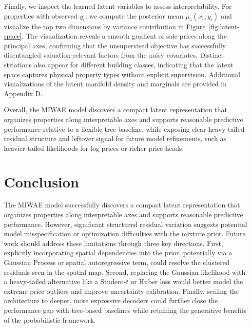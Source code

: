 \documentclass{article}
\begin{document}
Finally, we inspect the learned latent variables to assess interpretability. For properties with observed $y_i$, we compute the posterior mean $\mu_z(x_i, y_i)$ and visualize the top two dimensions by variance contribution in Figure~\ref{fig:latent-space}. The visualization reveals a smooth gradient of sale prices along the principal axes, confirming that the unsupervised objective has successfully disentangled valuation-relevant factors from the noisy covariates. Distinct striations also appear for different building classes, indicating that the latent space captures physical property types without explicit supervision. Additional visualizations of the latent manifold density and marginals are provided in Appendix D.





Overall, the MIWAE model discovers a compact latent representation that organizes properties along interpretable axes and supports reasonable predictive performance relative to a flexible tree baseline, while exposing clear heavy-tailed residual structure and leftover signal for future model refinements, such as heavier-tailed likelihoods for log prices or richer price heads.

\section{Conclusion}

The MIWAE model successfully discovers a compact latent representation that organizes properties along interpretable axes and supports reasonable predictive performance. However, significant structured residual variation suggests potential model misspecification or optimization difficulties with the mixture prior. Future work should address these limitations through three key directions. First, explicitly incorporating spatial dependencies into the prior, potentially via a Gaussian Process or spatial autoregressive term, could resolve the clustered residuals seen in the spatial map. Second, replacing the Gaussian likelihood with a heavy-tailed alternative like a Student-$t$ or Huber loss would better model the extreme price outliers and improve uncertainty calibration. Finally, scaling the architecture to deeper, more expressive decoders could further close the performance gap with tree-based baselines while retaining the generative benefits of the probabilistic framework.
\end{document}
